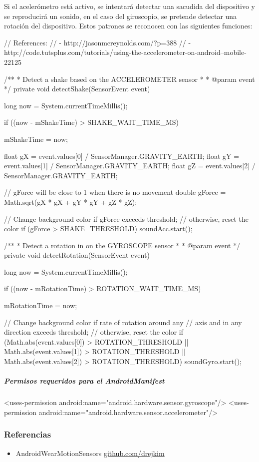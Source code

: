 \documentclass[	DIV=calc,%
							paper=a4,%
							fontsize=11pt]{scrartcl}	 					%
\begin{document}
Si el acelerómetro está activo, se intentará detectar una sacudida del
dispositivo y se reproducirá un sonido, en el caso del giroscopio, se
pretende detectar una rotación del dispositivo. Estos patrones se
reconocen con las siguientes funciones:

\begin{javacode}
	// References:
	//  - http://jasonmcreynolds.com/?p=388
	//  - http://code.tutsplus.com/tutorials/using-the-accelerometer-on-android--mobile-22125

	/**
	 * Detect a shake based on the ACCELEROMETER sensor
	 *
	 * @param event
	 */
	private void detectShake(SensorEvent event) {
			long now = System.currentTimeMillis();

			if ((now - mShakeTime) > SHAKE_WAIT_TIME_MS) {
					mShakeTime = now;

					float gX = event.values[0] / SensorManager.GRAVITY_EARTH;
					float gY = event.values[1] / SensorManager.GRAVITY_EARTH;
					float gZ = event.values[2] / SensorManager.GRAVITY_EARTH;

					// gForce will be close to 1 when there is no movement
					double gForce = Math.sqrt(gX * gX + gY * gY + gZ * gZ);

					// Change background color if gForce exceeds threshold;
					// otherwise, reset the color
					if (gForce > SHAKE_THRESHOLD) {
							soundAcc.start();
					}
			}
	}

	/**
	 * Detect a rotation in on the GYROSCOPE sensor
	 *
	 * @param event
	 */
	private void detectRotation(SensorEvent event) {
			long now = System.currentTimeMillis();

			if ((now - mRotationTime) > ROTATION_WAIT_TIME_MS) {
					mRotationTime = now;

					// Change background color if rate of rotation around any
					// axis and in any direction exceeds threshold;
					// otherwise, reset the color
					if (Math.abs(event.values[0]) > ROTATION_THRESHOLD ||
									Math.abs(event.values[1]) > ROTATION_THRESHOLD ||
									Math.abs(event.values[2]) > ROTATION_THRESHOLD) {
							soundGyro.start();
					}
			}
	}
\end{javacode}

\subparagraph{Permisos requeridos para el
AndroidManifest}\label{permisos-requeridos-para-el-androidmanifest-3}

\begin{xmlcode}
	<uses-permission android:name="android.hardware.sensor.gyroscope"/>
	<uses-permission android:name="android.hardware.sensor.accelerometer"/>
\end{xmlcode}

\subsubsection{Referencias}\label{referencias-2}

\begin{itemize}
\itemsep1pt\parskip0pt
\item
  AndroidWearMotionSensors \textbar{}
  \href{https://github.com/drejkim/AndroidWearMotionSensors}{github.com/drejkim}
\end{itemize}
\end{document}
